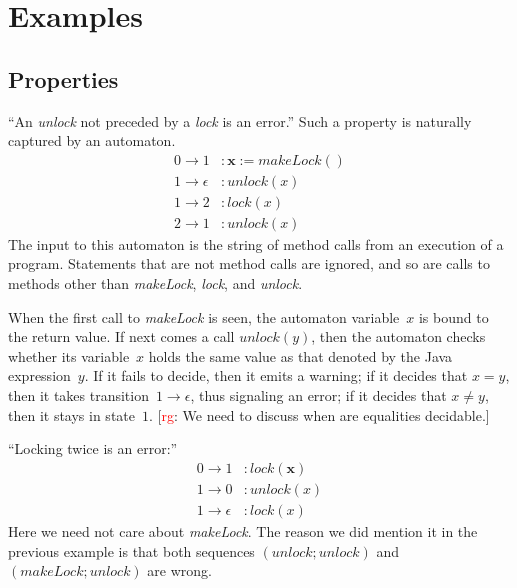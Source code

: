 \documentclass[a4paper]{article}
\newcommand{\todo}[2]{{\small [\textcolor{red}{#1}: #2]}}
\newcommand{\rg}[1]{\todo{rg}{#1}}
\theoremstyle{remark}
\begin{document}
\section{Examples}

\subsection{Properties}\label{sec:properties} %

``An \textit{unlock} not preceded by a \textit{lock} is an error.''
Such a property is naturally captured by an automaton.
\begin{equation}\label{eq:unlockunlock}
\begin{aligned}
0\to1&: \mathbf{x} := \mathit{makeLock}()\\
1\to\epsilon&: \mathit{unlock}(x)\\
1\to2&: \mathit{lock}(x)\\
2\to1&: \mathit{unlock}(x)
\end{aligned}
\end{equation}
The input to this automaton is the string of method calls from an execution of a program.
Statements that are not method calls are ignored, and so are calls to methods other than \textit{makeLock}, \textit{lock}, and \textit{unlock}.

When the first call to \textit{makeLock} is seen, the automaton variable~$x$ is bound to the return value.
If next comes a call $\mathit{unlock}(y)$, then the automaton checks whether its variable~$x$ holds the same value as that denoted by the Java expression~$y$.
If it fails to decide, then it emits a warning; if it decides that $x=y$, then it takes transition~$1\to\epsilon$, thus signaling an error; if it decides that $x\ne y$, then it stays in state~$1$.
\rg{We need to discuss when are equalities decidable.}

``Locking twice is an error:''
\begin{equation}
\begin{aligned}
0\to1&: \mathit{lock}(\mathbf x)\\
1\to0&: \mathit{unlock}(x)\\
1\to\epsilon&: \mathit{lock}(x)
\end{aligned}
\end{equation}
Here we need not care about \textit{makeLock}.
The reason we did mention it in the previous example is that both sequences $(\mathit{unlock}; \mathit{unlock})$ and $(\mathit{makeLock}; \mathit{unlock})$ are wrong.
\end{document}
